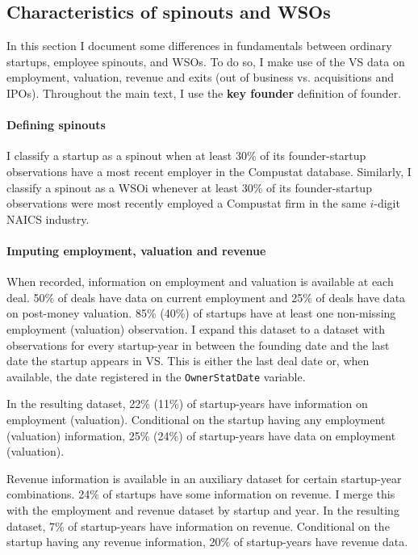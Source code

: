 \documentclass[12pt,english]{article}
\theoremstyle{remark}
\begin{document}
\subsection{Characteristics of spinouts and WSOs}\label{subsec:Char_of_spinouts_and_WSOs}

In this section I document some differences in fundamentals between ordinary startups, employee spinouts, and WSOs. To do so, I make use of the VS data on employment, valuation, revenue and exits (out of business vs. acquisitions and IPOs). Throughout the main text, I use the \textbf{key founder} definition of founder. 

\paragraph{Defining spinouts}

I classify a startup as a spinout when at least 30\% of its founder-startup observations have a most recent employer in the Compustat database. Similarly, I classify a spinout as a WSOi whenever at least 30\% of its founder-startup observations were most recently employed a Compustat firm in the same $i$-digit NAICS industry.


\paragraph{Imputing employment, valuation and revenue} When recorded, information on employment and valuation is available at each deal. 50\% of deals have data on current employment and 25\% of deals have data on post-money valuation. 85\% (40\%) of startups have at least one non-missing employment (valuation) observation. I expand this dataset to a dataset with observations for every startup-year in between the founding date and the last date the startup appears in VS. This is either the last deal date or, when available, the date registered in the \texttt{OwnerStatDate} variable. 

In the resulting dataset, 22\% (11\%) of startup-years have information on employment (valuation). Conditional on the startup having any employment (valuation) information, 25\% (24\%) of startup-years have data on employment (valuation). 

Revenue information is available in an auxiliary dataset for certain startup-year combinations. 24\% of startups have some information on revenue. I merge this with the employment and revenue dataset by startup and year. In the resulting dataset, 7\% of startup-years have information on revenue. Conditional on the startup having any revenue information, 20\% of startup-years have revenue data.
\end{document}
